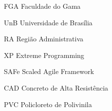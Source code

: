 \begin{siglas}
  \item[FGA] Faculdade do Gama
  \item[UnB] Universidade de Brasília
  \item[RA] Região Administrativa
  \item[XP] Extreme Programming
  \item[SAFe] Scaled Agile Framework
  \item[CAD] Concreto de Alta Resistência
  \item[PVC] Policloreto de Polivinila

\end{siglas}

